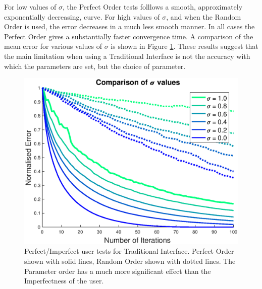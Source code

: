 \documentclass[11pt, oneside]{report}   	%
\begin{document}
For low values of $\sigma$, the Perfect Order tests folllows a smooth, approximately exponentially decreasing, curve. For high values of $\sigma$, and when the Random Order is used, the error decreases in a much less smooth manner. In all cases the Perfect Order gives a substantially faster convergence time. A comparison of the mean error for various values of $\sigma$ is shown in Figure \ref{fig:TradTest2}. These results suggest that the main limitation when using a Traditional Interface is not the accuracy with which the parameters are set, but the choice of parameter.
\begin{figure}
	\centering
	\includegraphics[width = 5in]{TradInterfaceTests2.eps}
	\caption{Perfect/Imperfect user tests for Traditional Interface. Perfect Order shown with solid lines, Random Order shown with dotted lines. The Parameter order has a much more significant effect than the Imperfectness of the user.}
	\label{fig:TradTest2}
	
\end{figure}
\end{document}
